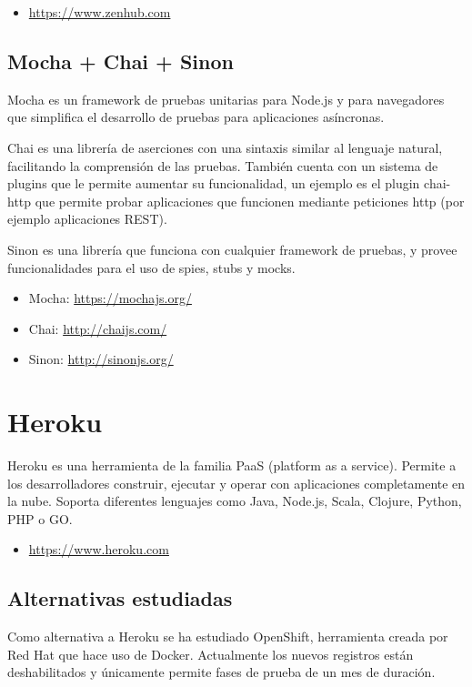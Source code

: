 \begin{itemize}
	\item \url{https://www.zenhub.com}
\end{itemize}

\subsection{Mocha + Chai + Sinon}

Mocha es un framework de pruebas unitarias para Node.js y para navegadores que simplifica el desarrollo de pruebas para aplicaciones asíncronas.

Chai es una librería de aserciones con una sintaxis similar al lenguaje natural, facilitando la comprensión de las pruebas. También cuenta con un sistema de plugins que le permite aumentar su funcionalidad, un ejemplo es el plugin chai-http que permite probar aplicaciones que funcionen mediante peticiones http (por ejemplo aplicaciones REST).

Sinon es una librería que funciona con cualquier framework de pruebas, y provee funcionalidades para el uso de spies, stubs y mocks. 

\begin{itemize}
	\item Mocha: \url{https://mochajs.org/}
	\item Chai: \url{http://chaijs.com/}
	\item Sinon: \url{http://sinonjs.org/}
\end{itemize}

\section{Heroku}

Heroku es una herramienta de la familia PaaS (platform as a service). Permite a los desarrolladores construir, ejecutar y operar con aplicaciones completamente en la nube. Soporta diferentes lenguajes como Java, Node.js, Scala, Clojure, Python, PHP o GO.

\begin{itemize}
	\item \url{https://www.heroku.com}
\end{itemize}

\subsection{Alternativas estudiadas}

Como alternativa a Heroku se ha estudiado OpenShift, herramienta creada por Red Hat que hace uso de Docker. Actualmente los nuevos registros están deshabilitados y únicamente permite fases de prueba de un mes de duración.

